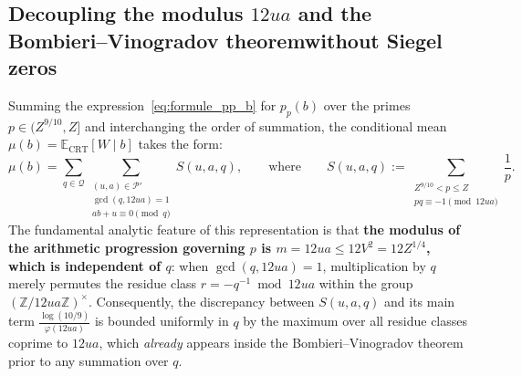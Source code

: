 \documentclass[11pt, a4paper]{article}
\theoremstyle{plain}
\theoremstyle{definition}
\newcommand{\Z}{\mathbb{Z}}
\newcommand{\Ebb}{\mathbb{E}}
\begin{document}
\subsection[Decoupling the modulus $12ua$ and the Bombieri--Vinogradov theorem without Siegel zeros]{Decoupling the modulus $12ua$ and the Bombieri--Vinogradov theorem\linebreak without Siegel zeros}\label{subsec:decouplage_BV}
Summing the expression~\eqref{eq:formule_pp_b} for $p_p(b)$ over the primes $p \in (Z^{9/10}, Z]$ and interchanging the order of summation, the conditional mean $\mu(b) = \Ebb_{\mathrm{CRT}}[W \mid b]$ takes the form:
\begin{equation}\label{eq:mu_b_somme_triple}
\mu(b) = \sum_{q \in \mathcal{Q}} \sum_{\substack{(u,a) \in \mathcal{P}' \\ \gcd(q, 12ua)=1 \\ ab+u \equiv 0 \pmod q}} S(u,a,q), \qquad \text{where} \qquad S(u,a,q) := \sum_{\substack{Z^{9/10} < p \le Z \\ pq \equiv -1 \pmod{12ua}}} \frac{1}{p}.
\end{equation}
The fundamental analytic feature of this representation is that \textbf{the modulus of the arithmetic progression governing $p$ is $m = 12ua \le 12V^2 = 12Z^{1/4}$, which is independent of $q$}: when $\gcd(q, 12ua) = 1$, multiplication by $q$ merely permutes the residue class $r = -q^{-1} \bmod{12ua}$ within the group $(\Z / 12ua\Z)^\times$. Consequently, the discrepancy between $S(u,a,q)$ and its main term $\frac{\log(10/9)}{\varphi(12ua)}$ is bounded uniformly in $q$ by the maximum over all residue classes coprime to $12ua$, which \emph{already} appears inside the Bombieri--Vinogradov theorem prior to any summation over $q$.
\end{document}
